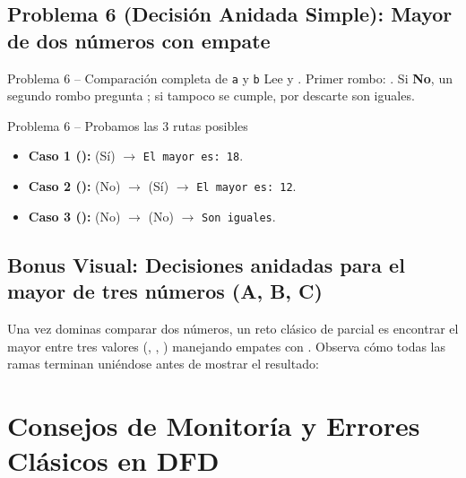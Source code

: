 \documentclass[11pt,letterpaper]{article}
\begin{document}
\subsection{Problema 6 (Decisión Anidada Simple): Mayor de dos números con empate}
\begin{analisis}{Problema 6 -- Comparación completa de \texttt{a} y \texttt{b}}
Lee  y . Primer rombo: . Si \textbf{No}, un segundo rombo pregunta ; si tampoco se cumple, por descarte son iguales.
\end{analisis}


\begin{pruebaescritorio}{Problema 6 -- Probamos las 3 rutas posibles}
\begin{itemize}
  \item \textbf{Caso 1 ():}  (Sí) $\rightarrow$ \texttt{El mayor es: 18}.
  \item \textbf{Caso 2 ():}  (No) $\rightarrow$  (Sí) $\rightarrow$ \texttt{El mayor es: 12}.
  \item \textbf{Caso 3 ():}  (No) $\rightarrow$  (No) $\rightarrow$ \texttt{Son iguales}.
\end{itemize}
\end{pruebaescritorio}

\subsection{Bonus Visual: Decisiones anidadas para el mayor de tres números (A, B, C)}
Una vez dominas comparar dos números, un reto clásico de parcial es encontrar el mayor entre tres valores (, , ) manejando empates con \codigo{>=}. Observa cómo todas las ramas terminan uniéndose antes de mostrar el resultado:


\section{Consejos de Monitoría y Errores Clásicos en DFD}
\end{document}
